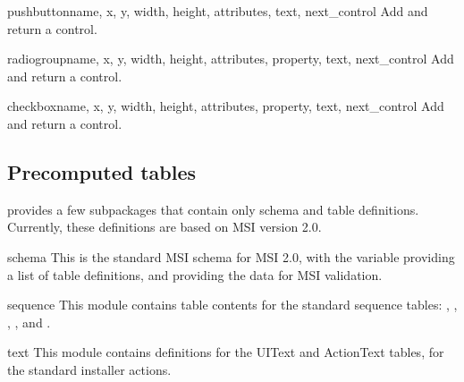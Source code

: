 \begin{methoddesc}[Dialog]{pushbutton}{name, x, y, width, height, attributes, 
                                 text, next_control}
  Add and return a  control.
\end{methoddesc}

\begin{methoddesc}[Dialog]{radiogroup}{name, x, y, width, height, 
                                 attributes, property, text, next_control}
  Add and return a  control.
\end{methoddesc}

\begin{methoddesc}[Dialog]{checkbox}{name, x, y, width, height, 
                                 attributes, property, text, next_control}
  Add and return a  control.
\end{methoddesc}

\begin{seealso}
\end{seealso}

\subsection{Precomputed tables\label{msi-tables}}

 provides a few subpackages that contain
only schema and table definitions. Currently, these definitions
are based on MSI version 2.0.

\begin{datadesc}{schema}
  This is the standard MSI schema for MSI 2.0, with the
   variable providing a list of table definitions,
  and  providing the data for
  MSI validation.
\end{datadesc}

\begin{datadesc}{sequence}
  This module contains table contents for the standard sequence
  tables: , ,
  , , and
  .
\end{datadesc}

\begin{datadesc}{text}
  This module contains definitions for the UIText and ActionText
  tables, for the standard installer actions.
\end{datadesc}
